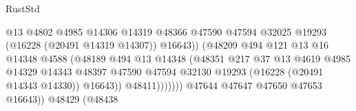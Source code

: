 \begin{lexlean}{RustStd}
\begin{coremodule}
                                                    @13
                                                    @4802
                                                    @4985
                                                    @14306
                                                    @14319
                                                    @48366
                                                    @47590
                                                    @47594
                                                    @32025
                                                    @19293
                                                    (@16228 (@20491 @14319 @14307))
                                                    @16643))
                                                (@48209
                                                  @494
                                                  @121
                                                  @13
                                                  @16
                                                  @14348
                                                  @4588
                                                  (@48189
                                                    @494
                                                    @13
                                                    @14348
                                                    (@48351
                                                      @217
                                                      @37
                                                      @13
                                                      @4619
                                                      @4985
                                                      @14329
                                                      @14343
                                                      @48397
                                                      @47590
                                                      @47594
                                                      @32130
                                                      @19293
                                                      (@16228 (@20491 @14343 @14330))
                                                      @16643))
                                                  @48411)))))))
                                    @47644
                                    @47647
                                    @47650
                                    @47653
                                    @16643))
                                @48429
                                (@48438

\end{coremodule}
\end{lexlean}
